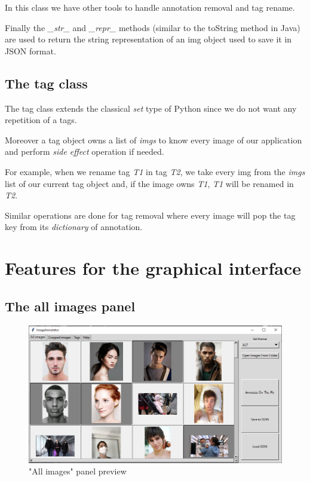 \documentclass[a4paper,12pt]{article}
\begin{document}
In this class we have other tools to handle annotation removal and tag rename.

Finally the \textit{\_str\_} and \textit{\_repr\_} methods (similar to the toString method in Java) are used to return the string representation of an img object used to save it in JSON format. 

\subsection{The tag class}
The tag class extends the classical \textit{set} type of Python since we do not want any repetition of a tags. 

Moreover a tag object owns a list of \textit{imgs} to know every image of our application and perform \textit{side effect} operation if needed.

For example, when we rename tag \textit{T1} in tag \textit{T2}, we take every img from the \textit{imgs} list of our current tag object and, if the image owns \textit{T1}, \textit{T1} will be renamed in \textit{T2}. 

Similar operations are done for tag removal where every image will pop the tag key from its \textit{dictionary} of annotation.  

\section{Features for the graphical interface}
\subsection{The all images panel} 
\begin{figure}
    \centering
    \includegraphics[width=1.0\textwidth]{images_latex/All_images.png}
    \caption{"All images" panel preview}
    \label{fig:all_img_panel}
\end{figure}
\end{document}
